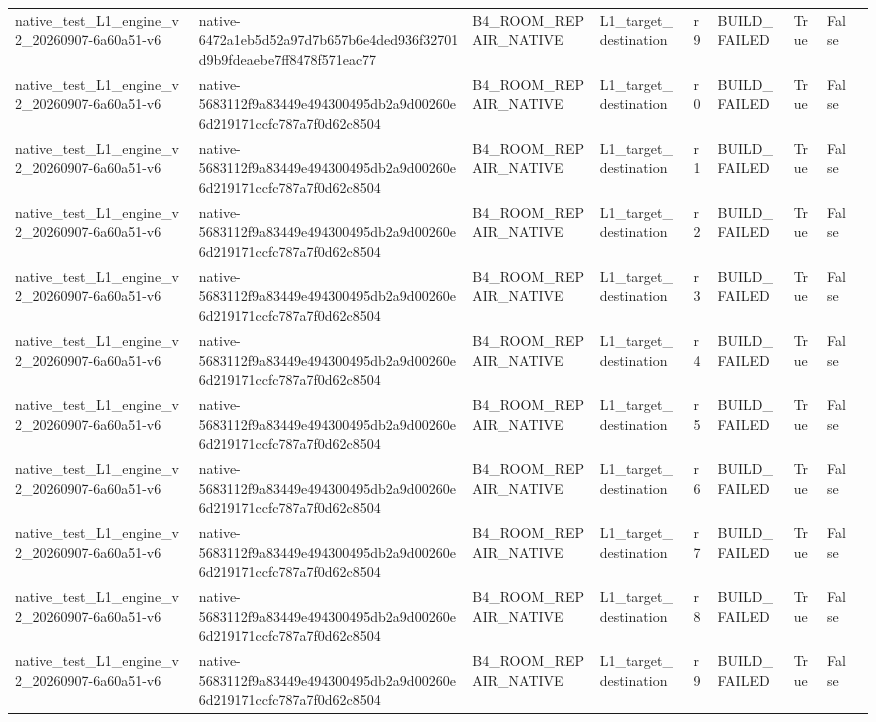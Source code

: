 \begin{tabular}{lllllllll}
native\_test\_L1\_engine\_v2\_20260907-6a60a51-v6 & native-6472a1eb5d52a97d7b657b6e4ded936f32701d9b9fdeaebe7ff8478f571eac77 & B4\_ROOM\_REPAIR\_NATIVE & L1\_target\_destination & r9 & BUILD\_FAILED & True & False &  \\
native\_test\_L1\_engine\_v2\_20260907-6a60a51-v6 & native-5683112f9a83449e494300495db2a9d00260e6d219171ccfc787a7f0d62c8504 & B4\_ROOM\_REPAIR\_NATIVE & L1\_target\_destination & r0 & BUILD\_FAILED & True & False &  \\
native\_test\_L1\_engine\_v2\_20260907-6a60a51-v6 & native-5683112f9a83449e494300495db2a9d00260e6d219171ccfc787a7f0d62c8504 & B4\_ROOM\_REPAIR\_NATIVE & L1\_target\_destination & r1 & BUILD\_FAILED & True & False &  \\
native\_test\_L1\_engine\_v2\_20260907-6a60a51-v6 & native-5683112f9a83449e494300495db2a9d00260e6d219171ccfc787a7f0d62c8504 & B4\_ROOM\_REPAIR\_NATIVE & L1\_target\_destination & r2 & BUILD\_FAILED & True & False &  \\
native\_test\_L1\_engine\_v2\_20260907-6a60a51-v6 & native-5683112f9a83449e494300495db2a9d00260e6d219171ccfc787a7f0d62c8504 & B4\_ROOM\_REPAIR\_NATIVE & L1\_target\_destination & r3 & BUILD\_FAILED & True & False &  \\
native\_test\_L1\_engine\_v2\_20260907-6a60a51-v6 & native-5683112f9a83449e494300495db2a9d00260e6d219171ccfc787a7f0d62c8504 & B4\_ROOM\_REPAIR\_NATIVE & L1\_target\_destination & r4 & BUILD\_FAILED & True & False &  \\
native\_test\_L1\_engine\_v2\_20260907-6a60a51-v6 & native-5683112f9a83449e494300495db2a9d00260e6d219171ccfc787a7f0d62c8504 & B4\_ROOM\_REPAIR\_NATIVE & L1\_target\_destination & r5 & BUILD\_FAILED & True & False &  \\
native\_test\_L1\_engine\_v2\_20260907-6a60a51-v6 & native-5683112f9a83449e494300495db2a9d00260e6d219171ccfc787a7f0d62c8504 & B4\_ROOM\_REPAIR\_NATIVE & L1\_target\_destination & r6 & BUILD\_FAILED & True & False &  \\
native\_test\_L1\_engine\_v2\_20260907-6a60a51-v6 & native-5683112f9a83449e494300495db2a9d00260e6d219171ccfc787a7f0d62c8504 & B4\_ROOM\_REPAIR\_NATIVE & L1\_target\_destination & r7 & BUILD\_FAILED & True & False &  \\
native\_test\_L1\_engine\_v2\_20260907-6a60a51-v6 & native-5683112f9a83449e494300495db2a9d00260e6d219171ccfc787a7f0d62c8504 & B4\_ROOM\_REPAIR\_NATIVE & L1\_target\_destination & r8 & BUILD\_FAILED & True & False &  \\
native\_test\_L1\_engine\_v2\_20260907-6a60a51-v6 & native-5683112f9a83449e494300495db2a9d00260e6d219171ccfc787a7f0d62c8504 & B4\_ROOM\_REPAIR\_NATIVE & L1\_target\_destination & r9 & BUILD\_FAILED & True & False &  \\

\end{tabular}
